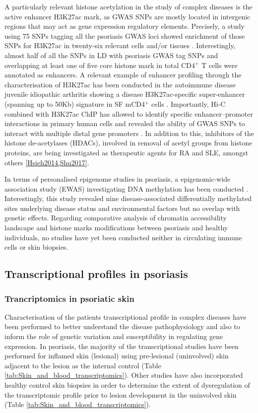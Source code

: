 A particularly relevant histone acetylation in the study of complex diseases is the active enhancer H3K27ac mark, as GWAS SNPs are mostly located in intergenic regions that may act as gene expression regulatory elements. Precisely, a study using 75 SNPs tagging all the psoriasis GWAS loci showed enrichment of those SNPs for H3K27ac in twenty-six relevant cells and/or tissues \parencite{Lin2018}. Interestingly, almost half of all the SNPs in LD with psoriasis GWAS tag SNPs and overlapping at least one of five core histone mark in total CD4$^+$ T cells were annotated as enhancers. A relevant example of enhancer profiling through the characterisation of H3K27ac has been conducted in the autoimmune disease juvenile idiopathic arthritis showing a disease H3K27ac-specific super-enhancer (spanning up to 50Kb) signature in SF mCD4$^+$ cells \parencite{Peeters2015}. Importantly, Hi-C combined with H3K27ac ChIP has allowed to identify specific enhancer–promoter interactions in primary human cells and revealed the ability of GWAS SNPs to interact with multiple distal gene promoters \parencite{Mumbach2017}. In addition to this, inhibitors of the histone de-acetylases (HDACs), involved in removal of acetyl groups from histone proteins, are being investigated as therapeutic agents for RA and SLE, amongst others \ref{Hsieh2014,Shu2017}.

In terms of personalised epigenome studies in psoriasis, a epigenomic-wide association study (EWAS) investigating DNA methylation has been conducted \parencite{Zhou2016}. Interestingly, this study revealed nine disease-associated differentially methylated sites underlying disease status and environmental factors but no overlap with genetic effects. Regarding comparative analysis of chromatin accessibility landscape and histone marks modifications between psoriasis and healthy individuals, no studies have yet been conducted neither in circulating immune cells or skin biopsies.


\subsection{Transcriptional profiles in psoriasis}

\subsubsection{Trancriptomics in psoriatic skin}
Characterisation of the patients transcriptional profile in complex diseases have been performed to better understand the disease pathophysiology and also to inform the role of genetic variation and susceptibility in regulating gene expression. In psoriasis, the majority of the transcriptional studies have been performed for inflamed skin (lesional) using pre-lesional (uninvolved) skin adjacent to the lesion as the internal control (Table \ref{tab:Skin_and_blood_transcriptomics}). Other studies have also incorporated healthy control skin biopsies in order to determine the extent of dysregulation of the transcriptomic profile prior to lesion development in the uninvolved skin (Table \ref{tab:Skin_and_blood_transcriptomics}). 



